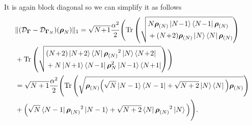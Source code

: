 \documentclass[a4paper,onecolumn,amsmath,amssymb,amsfonts,accepted=2026-03-06]{quantumarticle}
\newcommand{\xtr}[1]{\operatorname{Tr}\left(#1 \right)}
\newcommand{\cD}{\mathcal D}
\newcommand{\LL}{{\mathbf{\Gamma}}}
\newcommand{\rN}{{\boldsymbol{\rho}_{(N)}}}
\begin{document}
It is again block diagonal so we can simplify it as follows
\begin{align}
    \notag &\|(\cD_\LL-\cD_{\LL_N})(\boldsymbol{\rho}_N)\|_1 = \sqrt{N\!+\!1}\frac{\alpha^2}{2}\Biggl(\xtr{\sqrt{
        \begin{aligned}
            &N\rN \ket{N\!-\!1}\bra{N\!-\!1} \rN\\
            & + (N\!+\!2) \rN\ket{N}\bra{N}\rN
        \end{aligned}}
        }\\
    \notag & + \xtr{\sqrt{
        \begin{aligned}
            &(N\!+\!2) \ket{N\!+\!2}\bra{N} \rN^2\ket{N}\bra{N\!+\!2}\\
            & + N \ket{N\!+\!1}\bra{N\!-\!1} \boldsymbol{\rho}^2_N\ket{N\!-\!1}\bra{N\!+\!1}
        \end{aligned}
    }}\Biggr)\\
    \notag &=\sqrt{N+1}\frac{\alpha^2}{2} \Biggl(\xtr{\sqrt{\rN \Big(\sqrt{N}\ket{N-1}\bra{N-1} + \sqrt{N+2}\ket{N}\bra{N}\Big)\rN}}\\
    & + \Big(\sqrt{N}\bra{N-1}\rN^2\ket{N-1} + \sqrt{N+2}\bra{N}\rN^2\ket{N}\Big) \Biggr).
\end{align}


\printbibliography
\end{document}
